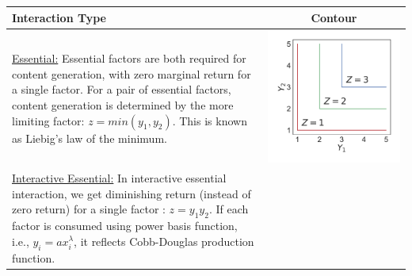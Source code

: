\begin{table}[h!]
  \centering
  \begin{tabular}{m{} c}
    \hline
    \textbf{Interaction Type} & \textbf{Contour}\\ \hline
    \uline{Essential:} Essential factors are both required for content generation, with zero marginal return for a single factor. For a pair of essential factors, content generation is determined by the more limiting factor: $z = min(y_1, y_2)$. This is known as Liebig's law of the minimum.
    &
    \begin{minipage}{.175\textwidth}
      \includegraphics[width=\textwidth, height=\textwidth]{Figures/Essential.pdf}
    \end{minipage}
    \\ 
    \uline{Interactive Essential:} In interactive essential interaction, we get diminishing return (instead of zero return) for a single factor : $z = y_1y_2$. If each factor is consumed using power basis function, i.e., $y_i = ax^\lambda_i$, it reflects Cobb-Douglas production function.
    &
    \begin{minipage}{.175\textwidth}

\end{minipage}
\end{tabular}
\end{table}
